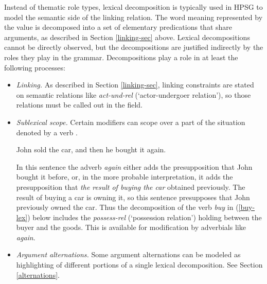 \documentclass[output=paper]{langsci/langscibook}
\begin{document}
%
%
%

Instead of thematic role types, lexical decomposition is typically used in HPSG to model the semantic side of the linking relation.  The word meaning represented by the \content value is decomposed into a set of elementary predications that share arguments, as described in Section \ref{linking-sec} above.  Lexical decompositions cannot be directly observed, but the decompositions are justified indirectly by the roles they play in the grammar.  Decompositions play a role in at least the following processes:

\begin{itemize}
\item  \textit{Linking.}  As described in Section \ref{linking-sec}, linking constraints are stated on semantic relations like \textit{act-und-rel} (`actor-undergoer relation'), so those relations must be called out in the \content field.
\item \textit{Sublexical scope.}  Certain modifiers can scope over a part of the situation denoted by a verb \citep{Dowty:1979a}.  

\begin{exe}
\label{again}
\ex John sold the car, and then he bought it again.
\end{exe}

In this sentence the adverb \textit{again} either adds the presupposition that John bought it before, or, in the more probable interpretation, it adds the presupposition that \textit{the result of buying the car} obtained previously.  The result of buying a car is owning it, so this sentence presupposes that John previously owned the car. Thus the decomposition of the verb \textit{buy} in (\ref{buy-lex}) below includes the \textit{possess-rel} (`possession relation') holding between the buyer and the goods.  This is available for modification by adverbials like \textit{again}.
\item \textit{Argument alternations.}  Some argument alternations can be modeled as highlighting of different portions of a single lexical decomposition.  See Section \ref{alternations}.  
\end{itemize}  
\end{document}

